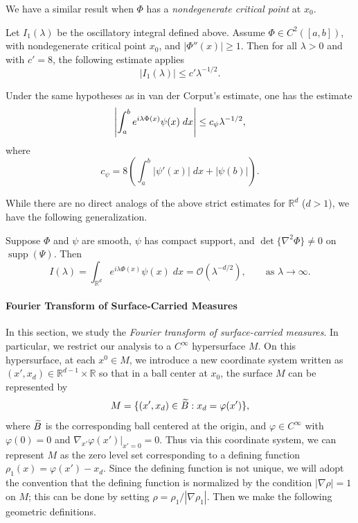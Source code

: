 \documentclass{article}
\begin{document}
We have a similar result when $\Phi$ has a \textit{nondegenerate critical point} at $x_{0}$. 
\begin{prop}
	Let $I_{1}(\lambda)$ be the oscillatory integral defined above. Assume $\Phi \in C^{2}([a,b])$, with nondegenerate critical point $x_{0}$, and $|\Phi''(x)| \geq 1$. Then for all $\lambda > 0$ and with $c' = 8$, the following estimate applies 
	\begin{equation*}
		|I_{1}(\lambda)| \leq c'\lambda^{-1/2}. 
	\end{equation*} 
\end{prop} 
\begin{corollary}
	Under the same hypotheses as in van der Corput's estimate, one has the estimate 
	\begin{equation*}
		\left| \int_{a}^{b}e^{i\lambda \Phi(x)}\psi(x)\;dx \right| \leq c_{\psi}\lambda^{-1/2}, 
	\end{equation*} 
	where 
	\begin{equation*}
		c_{\psi} = 8\left(\int_{a}^{b}|\psi'(x)|\;dx + |\psi(b)|\right). 
	\end{equation*}
\end{corollary} 
While there are no direct analogs of the above strict estimates for $\mathbb{R}^{d}$ ($d > 1$), we have the following generalization. 
\begin{prop}
	Suppose $\Phi$ and $\psi$ are smooth, $\psi$ has compact support, and $\det\{\nabla^{2}\Phi\} \neq 0$ on $\operatorname{supp}(\Psi)$. Then 
	\begin{equation*}
		I(\lambda) = \int_{\mathbb{R}^{d}}e^{i\lambda \Phi(x)}\psi(x)\;dx = \mathcal{O}(\lambda^{-d/2}), \qquad \text{as } \lambda \to \infty. 
	\end{equation*}
\end{prop} 

\paragraph{Fourier Transform of Surface-Carried Measures}
In this section, we study the \textit{Fourier transform of surface-carried measures}. In particular, we restrict our analysis to a $C^{\infty}$ hypersurface $M$. On this hypersurface, at each $x^{0} \in M$, we introduce a new coordinate system written as $(x', x_{d}) \in \mathbb{R}^{d - 1} \times \mathbb{R}$ so that in a ball center at $x_{0}$, the surface $M$ can be represented by 
\begin{equation*}
	M = \{(x', x_{d}) \in \widetilde{B}: x_{d} = \varphi(x')\}, 
\end{equation*} 
where $\widetilde{B}$ is the corresponding ball centered at the origin, and $\varphi \in C^{\infty}$ with $\varphi(0) = 0$ and $\nabla_{x'}\varphi(x')|_{x' = 0} =0$. Thus via this coordinate system, we can represent $M$ as the zero level set corresponding to a defining function $\rho_{1}(x) = \varphi(x') - x_{d}$. Since the defining function is not unique, we will adopt the convention that the defining function is normalized by the condition $|\nabla \rho| = 1$ on $M$; this can be done by setting $\rho = \rho_{1}/|\nabla \rho_{1}|$. Then we make the following geometric definitions. 
\end{document}
